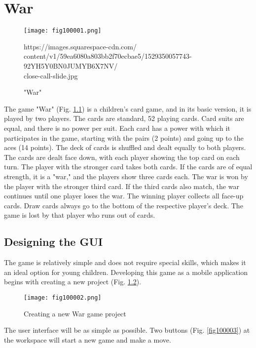 \chapter{War}

\begin{figure}[H]
   \centering
   \texttt{[image: fig100001.png]}
   \caption{"War"}
\label{fig100001}
https://images.squarespace-cdn.com/ \\ content/v1/59ea6080a803bb2f70ecbae5/1529350057743-92YH5Y0BN0JUMYB6X7NV/ \\ close-call-slide.jpg
\end{figure}

The game "War" (Fig. \ref{fig100001}) is a children's card game, and in its basic version, it is played by two players. The cards are standard, 52 playing cards. Card suits are equal, and there is no power per suit. Each card has a power with which it participates in the game, starting with the pairs (2 points) and going up to the aces (14 points). The deck of cards is shuffled and dealt equally to both players. The cards are dealt face down, with each player showing the top card on each turn. The player with the stronger card takes both cards. If the cards are of equal strength, it is a "war," and the players show three cards each. The war is won by the player with the stronger third card. If the third cards also match, the war continues until one player loses the war. The winning player collects all face-up cards. Draw cards always go to the bottom of the respective player's deck. The game is lost by that player who runs out of cards.

\section{Designing the GUI}

The game is relatively simple and does not require special skills, which makes it an ideal option for young children. Developing this game as a mobile application begins with creating a new project (Fig. \ref{fig100002}).

\begin{figure}[H]
   \centering
   \texttt{[image: fig100002.png]}
   \caption{Creating a new War game project}
\label{fig100002}
\end{figure}

The user interface will be as simple as possible. Two buttons (Fig. \ref{fig100003}) at the workspace will start a new game and make a move.

